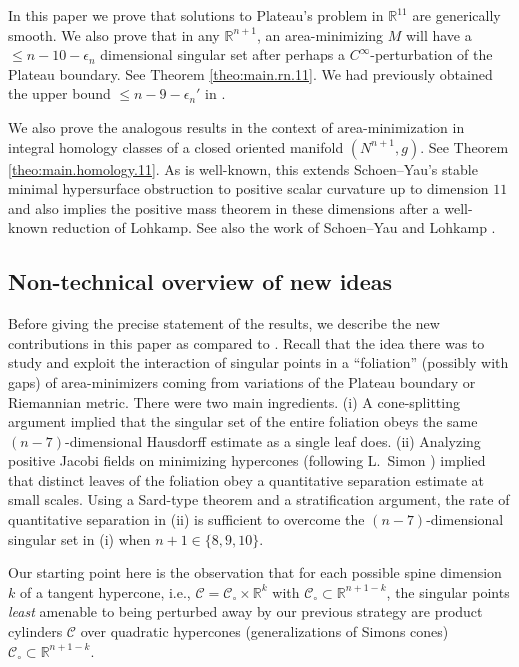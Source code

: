 \documentclass[11pt, letterpaper, reqno]{amsart}
\numberwithin{equation}{section}
\theoremstyle{remark}
\newcommand{\RR}{\mathbb{R}}
\newcommand{\cC}{\mathcal{C}}
\begin{document}
In this paper we prove that solutions to Plateau's problem in $\RR^{11}$ are generically smooth. We also prove that in any $\RR^{n+1}$, an area-minimizing $M$ will have a $\leq n-10-\epsilon_n$ dimensional singular set after perhaps a $C^\infty$-perturbation of the Plateau boundary. See Theorem \ref{theo:main.rn.11}. We had previously obtained the upper bound $\leq n - 9 - \epsilon_n'$ in \cite{CMS:generic.codim.plus.2}.

We also prove the analogous results in the context of area-minimization in integral homology classes of a closed oriented manifold $(N^{n+1}, g)$. See Theorem \ref{theo:main.homology.11}. As is well-known, this extends Schoen--Yau's stable minimal hypersurface obstruction to positive scalar curvature up to dimension $11$ and also implies the positive mass theorem in these dimensions after a well-known reduction of Lohkamp. See also the work of Schoen--Yau and Lohkamp \cite{SY:sing,Lohkamp:PSC}.

\subsection{Non-technical overview of new ideas} Before giving the precise statement of the results, we describe the new contributions in this paper as compared to \cite{CMS:generic.9.10,CMS:generic.codim.plus.2}. Recall that the idea there was to study and exploit the interaction of singular points in a ``foliation'' (possibly with gaps) of area-minimizers coming from variations of the Plateau boundary or Riemannian metric. There were two main ingredients. (i) A cone-splitting argument implied that the singular set of the entire foliation obeys the same $(n-7)$-dimensional Hausdorff estimate as a single leaf does. (ii) Analyzing positive Jacobi fields on minimizing hypercones (following L.\ Simon \cite{Simon:decay}) implied that distinct leaves of the foliation obey a quantitative separation estimate at small scales. Using a Sard-type theorem and a stratification argument, the rate of quantitative separation in (ii) is sufficient to overcome the $(n-7)$-dimensional singular set in (i) when $n+1\in\{8,9,10\}$. 

Our starting point here is the observation that for each possible spine dimension $k$ of a tangent hypercone, i.e., $\cC = \cC_\circ \times \RR^k$ with $\cC_\circ \subset \RR^{n+1-k}$, the singular points \emph{least} amenable to being perturbed away by our previous strategy are {product cylinders} $\cC$ over {quadratic hypercones} (generalizations of Simons cones) $\cC_\circ \subset \RR^{n+1-k}$. 
\end{document}

